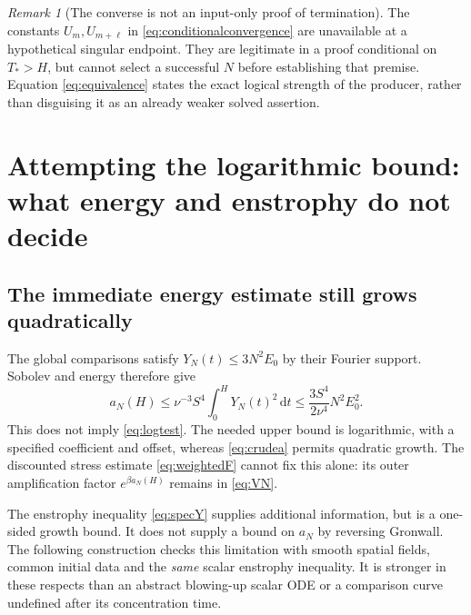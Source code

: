 \documentclass[11pt,a4paper]{article}
\theoremstyle{definition}\newtheorem{definition}[theorem]{Definition}
\theoremstyle{remark}\newtheorem{remark}[theorem]{Remark}
\newcommand{\dd}{\,\mathrm d}
\numberwithin{equation}{section}
\begin{document}
\begin{remark}[The converse is not an input-only proof of termination]
The constants $U_m,U_{m+\ell}$ in \eqref{eq:conditionalconvergence} are unavailable at a hypothetical singular endpoint. They are legitimate in a proof conditional on $T_*>H$, but cannot select a successful $N$ before establishing that premise. Equation \eqref{eq:equivalence} states the exact logical strength of the producer, rather than disguising it as an already weaker solved assertion.
\end{remark}

\section{Attempting the logarithmic bound: what energy and enstrophy do not decide}
\label{sec:attempt}
\subsection{The immediate energy estimate still grows quadratically}
The global comparisons satisfy $Y_N(t)\le3N^2E_0$ by their Fourier support. Sobolev and energy therefore give
\begin{equation}\label{eq:crudea}
 a_N(H)\le\nu^{-3}S^4\int_0^H Y_N(t)^2\dd t
 \le\frac{3S^4}{2\nu^4}N^2E_0^2.
\end{equation}
This does not imply \eqref{eq:logtest}. The needed upper bound is logarithmic, with a specified coefficient and offset, whereas \eqref{eq:crudea} permits quadratic growth. The discounted stress estimate \eqref{eq:weightedF} cannot fix this alone: its outer amplification factor $e^{\beta a_N(H)}$ remains in \eqref{eq:VN}.

The enstrophy inequality \eqref{eq:specY} supplies additional information, but is a one-sided growth bound. It does not supply a bound on $a_N$ by reversing Gronwall. The following construction checks this limitation with smooth spatial fields, common initial data and the \emph{same} scalar enstrophy inequality. It is stronger in these respects than an abstract blowing-up scalar ODE or a comparison curve undefined after its concentration time.
\end{document}
